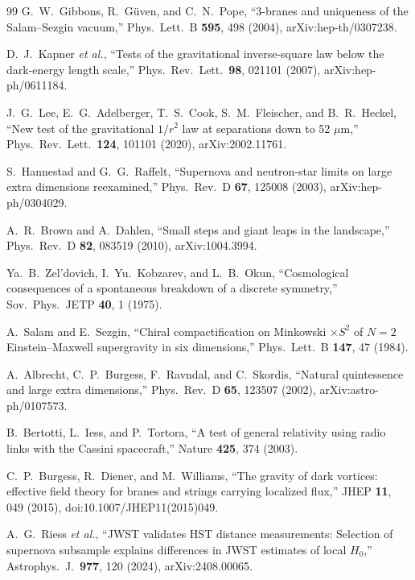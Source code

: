 \documentclass[aps,prd,reprint,superscriptaddress,nofootinbib,floatfix]{revtex4-2}
\theoremstyle{definition}
\begin{document}
\begin{thebibliography}{99}
 G.~W.~Gibbons, R.~G\"uven, and C.~N.~Pope, ``3-branes and uniqueness of the Salam--Sezgin vacuum,'' Phys.\ Lett.\ B \textbf{595}, 498 (2004), arXiv:hep-th/0307238.

 D.~J.~Kapner \emph{et al.}, ``Tests of the gravitational inverse-square law below the dark-energy length scale,'' Phys.\ Rev.\ Lett.\ \textbf{98}, 021101 (2007), arXiv:hep-ph/0611184.

 J.~G.~Lee, E.~G.~Adelberger, T.~S.~Cook, S.~M.~Fleischer, and B.~R.~Heckel, ``New test of the gravitational $1/r^2$ law at separations down to 52 $\mu$m,'' Phys.\ Rev.\ Lett.\ \textbf{124}, 101101 (2020), arXiv:2002.11761.

 S.~Hannestad and G.~G.~Raffelt, ``Supernova and neutron-star limits on large extra dimensions reexamined,'' Phys.\ Rev.\ D \textbf{67}, 125008 (2003), arXiv:hep-ph/0304029.

 A.~R.~Brown and A.~Dahlen, ``Small steps and giant leaps in the landscape,'' Phys.\ Rev.\ D \textbf{82}, 083519 (2010), arXiv:1004.3994.

 Ya.~B.~Zel'dovich, I.~Yu.~Kobzarev, and L.~B.~Okun, ``Cosmological consequences of a spontaneous breakdown of a discrete symmetry,'' Sov.\ Phys.\ JETP \textbf{40}, 1 (1975).

 A.~Salam and E.~Sezgin, ``Chiral compactification on Minkowski $\times S^2$ of $N=2$ Einstein--Maxwell supergravity in six dimensions,'' Phys.\ Lett.\ B \textbf{147}, 47 (1984).

 A.~Albrecht, C.~P.~Burgess, F.~Ravndal, and C.~Skordis, ``Natural quintessence and large extra dimensions,'' Phys.\ Rev.\ D \textbf{65}, 123507 (2002), arXiv:astro-ph/0107573.

 B.~Bertotti, L.~Iess, and P.~Tortora, ``A test of general relativity using radio links with the Cassini spacecraft,'' Nature \textbf{425}, 374 (2003).

 C.~P.~Burgess, R.~Diener, and M.~Williams, ``The gravity of dark vortices: effective field theory for branes and strings carrying localized flux,'' JHEP \textbf{11}, 049 (2015), doi:10.1007/JHEP11(2015)049.

 A.~G.~Riess \emph{et al.}, ``JWST validates HST distance measurements: Selection of supernova subsample explains differences in JWST estimates of local $H_0$,'' Astrophys.\ J.\ \textbf{977}, 120 (2024), arXiv:2408.00065.


\end{thebibliography}
\end{document}
